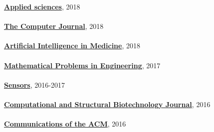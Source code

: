 \href{http://www.mdpi.com/journal/applsci}{\textbf{Applied sciences}}, 2018
\\ \halfblankline \\
\href{https://academic.oup.com/comjnl}{\textbf{The Computer Journal}}, 2018
\\ \halfblankline \\
\href{https://www.journals.elsevier.com/artificial-intelligence-in-medicine/}{\textbf{Artificial Intelligence in Medicine}}, 2018
\\ \halfblankline \\
\href{https://www.hindawi.com/journals/mpe/}{\textbf{Mathematical Problems in Engineering}}, 2017
\\ \halfblankline \\
\href{http://www.mdpi.com/journal/sensors}{\textbf{Sensors}}, 2016-2017
\\ \halfblankline \\
\href{https://www.journals.elsevier.com/computational-and-structural-biotechnology-journal/}{\textbf{Computational and Structural Biotechnology Journal}}, 2016
\\ \halfblankline \\
\href{http://cacm.acm.org/}{\textbf{Communications of the ACM}}, 2016
